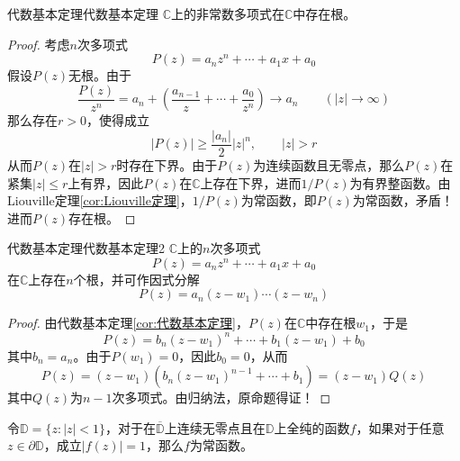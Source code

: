 \documentclass[lang = cn, scheme = chinese, thmcnt = section]{elegantbook}
\newcommand{\C}{\mathbb{C}}  		   %
\begin{document}
\begin{corollary}{代数基本定理}{代数基本定理}
	$\C$上的非常数多项式在$\C$中存在根。
\end{corollary}

\begin{proof}
	考虑$n$次多项式%
	$$
	P(z)=a_nz^n+\cdots +a_1x+a_0
	$$
	假设$P(z)$无根。由于%
	$$
	\frac{P(z)}{z^n}=a_n+\left(\frac{a_{n-1}}{z}+\cdots+\frac{a_0}{z^n}\right)\to a_n
	\qquad (|z|\to\infty)
	$$
	那么存在$r>0$，使得成立
	$$
	|P(z)|\ge\frac{|a_n|}{2}|z|^n,\qquad |z|>r
	$$
	从而$P(z)$在$|z|>r$时存在下界。由于$P(z)$为连续函数且无零点，那么$P(z)$在紧集$|z|\le r$上有界，因此$P(z)$在$\C$上存在下界，进而$1/P(z)$为有界整函数。由Liouville定理\ref{cor:Liouville定理}，$1/P(z)$为常函数，即$P(z)$为常函数，矛盾！进而$P(z)$存在根。
\end{proof}

\begin{corollary}{代数基本定理}{代数基本定理2}
	$\C$上的$n$次多项式
	$$
	P(z)=a_nz^n+\cdots +a_1x+a_0
	$$
	在$\C$上存在$n$个根，并可作因式分解%
	$$
	P(z)=a_n(z-w_1)\cdots(z-w_n)
	$$
\end{corollary}

\begin{proof}
	由代数基本定理\ref{cor:代数基本定理}，$P(z)$在$\C$中存在根$w_1$，于是%
	$$
	P(z)=b_n(z-w_1)^n+\cdots+b_1(z-w_1)+b_0
	$$
	其中$b_n=a_n$。由于$P(w_1)=0$，因此$b_0=0$，从而%
	$$
	P(z)=(z-w_1)(b_n(z-w_1)^{n-1}+\cdots+b_1)=(z-w_1)Q(z)
	$$
	其中$Q(z)$为$n-1$次多项式。由归纳法，原命题得证！
\end{proof}

\begin{proposition}
	令$\mathbb{D}=\{z:|z|<1\}$，对于在$\overline{\mathbb{D}}$上连续无零点且在$\mathbb{D}$上全纯的函数$f$，如果对于任意$z\in\partial \mathbb{D}$，成立$|f(z)|=1$，那么$f$为常函数。
\end{proposition}
\end{document}
